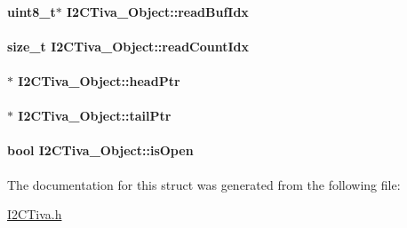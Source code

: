 \paragraph[{read\-Buf\-Idx}]{\setlength{\rightskip}{0pt plus 5cm}uint8\-\_\-t$\ast$ I2\-C\-Tiva\-\_\-\-Object\-::read\-Buf\-Idx}\label{struct_i2_c_tiva___object_a6df9e5e6f703e9b23bc325bc70a3ac2a}
\paragraph[{read\-Count\-Idx}]{\setlength{\rightskip}{0pt plus 5cm}size\-\_\-t I2\-C\-Tiva\-\_\-\-Object\-::read\-Count\-Idx}\label{struct_i2_c_tiva___object_ad3b3a075a971c85b4e2a00665d208866}
\paragraph[{head\-Ptr}]{$\ast$ I2\-C\-Tiva\-\_\-\-Object\-::head\-Ptr}\label{struct_i2_c_tiva___object_ab004ef4879f8e53ef8cfcec4c5589cdb}
\paragraph[{tail\-Ptr}]{$\ast$ I2\-C\-Tiva\-\_\-\-Object\-::tail\-Ptr}\label{struct_i2_c_tiva___object_af9dbef087eec693dd7dd41822b52b8bd}
\paragraph[{is\-Open}]{\setlength{\rightskip}{0pt plus 5cm}bool I2\-C\-Tiva\-\_\-\-Object\-::is\-Open}\label{struct_i2_c_tiva___object_a8026898ec8dd40f92c6a1acdbc599832}


The documentation for this struct was generated from the following file\-:\begin{DoxyCompactItemize}
\item 
\hyperlink{_i2_c_tiva_8h}{I2\-C\-Tiva.\-h}\end{DoxyCompactItemize}
